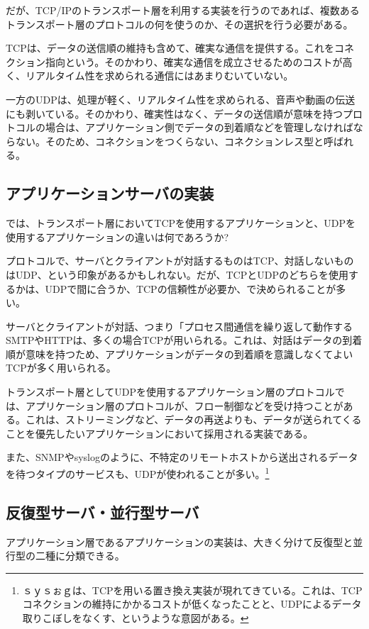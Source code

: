 だが、TCP/IPのトランスポート層を利用する実装を行うのであれば、複数あるトランスポート層のプロトコルの何を使うのか、その選択を行う必要がある。

TCPは、データの送信順の維持も含めて、確実な通信を提供する。これをコネクション指向という。そのかわり、確実な通信を成立させるためのコストが高く、リアルタイム性を求められる通信にはあまりむいていない。

一方のUDPは、処理が軽く、リアルタイム性を求められる、音声や動画の伝送にも剥いている。そのかわり、確実性はなく、データの送信順が意味を持つプロトコルの場合は、アプリケーション側でデータの到着順などを管理しなければならない。そのため、コネクションをつくらない、コネクションレス型と呼ばれる。


\subsection{アプリケーションサーバの実装}

では、トランスポート層においてTCPを使用するアプリケーションと、UDPを使用するアプリケーションの違いは何であろうか?

プロトコルで、サーバとクライアントが対話するものはTCP、対話しないものはUDP、という印象があるかもしれない。だが、TCPとUDPのどちらを使用するかは、UDPで間に合うか、TCPの信頼性が必要か、で決められることが多い。

サーバとクライアントが対話、つまり「プロセス間通信を繰り返して動作するSMTPやHTTPは、多くの場合TCPが用いられる。これは、対話はデータの到着順が意味を持つため、アプリケーションがデータの到着順を意識しなくてよいTCPが多く用いられる。

トランスポート層としてUDPを使用するアプリケーション層のプロトコルでは、アプリケーション層のプロトコルが、フロー制御などを受け持つことがある。これは、ストリーミングなど、データの再送よりも、データが送られてくることを優先したいアプリケーションにおいて採用される実装である。

また、SNMPやsyslogのように、不特定のリモートホストから送出されるデータを待つタイプのサービスも、UDPが使われることが多い。\footnote{ｓｙｓぉｇは、TCPを用いる置き換え実装が現れてきている。これは、TCPコネクションの維持にかかるコストが低くなったことと、UDPによるデータ取りこぼしをなくす、というような意図がある。}

\subsection{反復型サーバ・並行型サーバ}
アプリケーション層であるアプリケーションの実装は、大きく分けて反復型と並行型の二種に分類できる。

